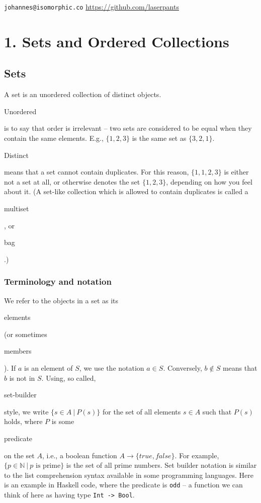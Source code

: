\documentclass[11pt]{article}
\theoremstyle{plain}
\theoremstyle{definition}
\begin{document}
 
\noindent \verb|johannes@isomorphic.co| \hfill \url{https://github.com/laserpants} 

\section*{1. Sets and Ordered Collections}

\subsection*{Sets}

A set is an unordered collection of distinct objects. \begin{em}Unordered\end{em} is to say that order is irrelevant -- two sets are considered to be equal when they contain the same elements. E.g., $ \{ 1, 2, 3 \} $ is the same set as $ \{ 3, 2, 1 \} $. \begin{em}Distinct\end{em} means that a set cannot contain duplicates. For this reason, $ \{ 1, 1, 2, 3 \} $ is either not a set at all, or otherwise denotes the set $ \{ 1, 2, 3 \} $, depending on how you feel about it. (A set-like collection which is allowed to contain duplicates is called a \begin{em}multiset\end{em}, or \begin{em}bag\end{em}.) 

\subsubsection*{Terminology and notation}

We refer to the objects in a set as its \begin{em}elements\end{em} (or sometimes \begin{em}members\end{em}). If $ a $ is an element of $ S $, we use the notation $ a \in S $. Conversely, $ b \notin S $ means that $ b $ is not in $ S $. Using, so called, \begin{em}set-builder\end{em} style, we write $ \{ s \in A \ | \ P(s) \} $ for the set of all elements $ s \in A $ such that $ P(s) $ holds, where $ P $ is some \begin{em}predicate\end{em} on the set $ A $, i.e., a boolean function $ A \rightarrow \{ true, false \} $. For example, $ \{ p \in \mathbb{N} \ | \ p \text{ is prime} \} $ is the set of all prime numbers. Set builder notation is similar to the list comprehension syntax available in some programming languages. Here is an example in Haskell code, where the predicate is \verb|odd| -- a function we can think of here as having type \verb|Int -> Bool|.
\end{document}
